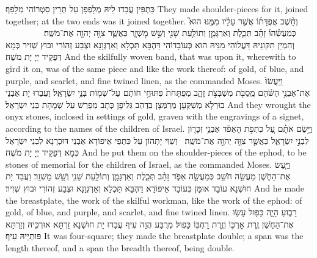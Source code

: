{כַּתְפִּין עֲבַדוּ לֵיהּ מְלָפְפָן עַל תְּרֵין סִטְרוֹהִי מְלָפַף׃}
{They made shoulder-pieces for it, joined together; at the two ends was it joined together.}{}
{וְחֵ֨שֶׁב אֲפֻדָּת֜וֹ אֲשֶׁ֣ר עָלָ֗יו מִמֶּ֣נּוּ הוּא֮ כְּמַעֲשֵׂ֒הוּ֒ זָהָ֗ב תְּכֵ֧לֶת וְאַרְגָּמָ֛ן וְתוֹלַ֥עַת שָׁנִ֖י וְשֵׁ֣שׁ מׇשְׁזָ֑ר כַּאֲשֶׁ֛ר צִוָּ֥ה יְהֹוָ֖ה אֶת־מֹשֶֽׁה׃ \setuma         }
{וְהִמְיַן תִּקּוּנֵיהּ דַּעֲלוֹהִי מִנֵּיהּ הוּא כְּעוֹבָדוֹהִי דַּהְבָּא תַּכְלָא וְאַרְגְּוָנָא וּצְבַע זְהוֹרִי וּבוּץ שְׁזִיר כְּמָא דְּפַקֵּיד יְיָ יָת מֹשֶׁה׃}
{And the skilfully woven band, that was upon it, wherewith to gird it on, was of the same piece and like the work thereof: of gold, of blue, and purple, and scarlet, and fine twined linen, as the \lord\space commanded Moses.}{}
{וַֽיַּעֲשׂוּ֙ אֶת־אַבְנֵ֣י הַשֹּׁ֔הַם מֻֽסַבֹּ֖ת מִשְׁבְּצֹ֣ת זָהָ֑ב מְפֻתָּחֹת֙ פִּתּוּחֵ֣י חוֹתָ֔ם עַל־שְׁמ֖וֹת בְּנֵ֥י יִשְׂרָאֵֽל׃}
{וַעֲבַדוּ יָת אַבְנֵי בוּרְלָא מְשַׁקְּעָן מְרַמְּצָן בִּדְהַב גְּלִיפָן כְּתָב מְפָרַשׁ עַל שְׁמָהָת בְּנֵי יִשְׂרָאֵל׃}
{And they wrought the onyx stones, inclosed in settings of gold, graven with the engravings of a signet, according to the names of the children of Israel.}{}
{וַיָּ֣שֶׂם אֹתָ֗ם עַ֚ל כִּתְפֹ֣ת הָאֵפֹ֔ד אַבְנֵ֥י זִכָּר֖וֹן לִבְנֵ֣י יִשְׂרָאֵ֑ל כַּאֲשֶׁ֛ר צִוָּ֥ה יְהֹוָ֖ה אֶת־מֹשֶֽׁה׃ \petucha }
{וְשַׁוִּי יָתְהוֹן עַל כִּתְפֵי אֵיפוֹדָא אַבְנֵי דּוּכְרָנָא לִבְנֵי יִשְׂרָאֵל כְּמָא דְּפַקֵּיד יְיָ יָת מֹשֶׁה׃}
{And he put them on the shoulder-pieces of the ephod, to be stones of memorial for the children of Israel, as the \lord\space commanded Moses.}{}
{וַיַּ֧עַשׂ אֶת־הַחֹ֛שֶׁן מַעֲשֵׂ֥ה חֹשֵׁ֖ב כְּמַעֲשֵׂ֣ה אֵפֹ֑ד זָהָ֗ב תְּכֵ֧לֶת וְאַרְגָּמָ֛ן וְתוֹלַ֥עַת שָׁנִ֖י וְשֵׁ֥שׁ מׇשְׁזָֽר׃}
{וַעֲבַד יָת חוּשְׁנָא עוֹבָד אוּמָּן כְּעוֹבָד אֵיפוֹדָא דַּהְבָּא תַּכְלָא וְאַרְגְּוָנָא וּצְבַע זְהוֹרִי וּבוּץ שְׁזִיר׃}
{And he made the breastplate, the work of the skilful workman, like the work of the ephod: of gold, of blue, and purple, and scarlet, and fine twined linen.}{}
{רָב֧וּעַ הָיָ֛ה כָּפ֖וּל עָשׂ֣וּ אֶת־הַחֹ֑שֶׁן זֶ֧רֶת אׇרְכּ֛וֹ וְזֶ֥רֶת רׇחְבּ֖וֹ כָּפֽוּל׃}
{מְרֻבַּע הֲוָה עִיף עֲבַדוּ יָת חוּשְׁנָא זַרְתָּא אוּרְכֵּיהּ וְזַרְתָּא פּוּתְיֵיהּ עִיף׃}
{It was four-square; they made the breastplate double; a span was the length thereof, and a span the breadth thereof, being double.}{}
